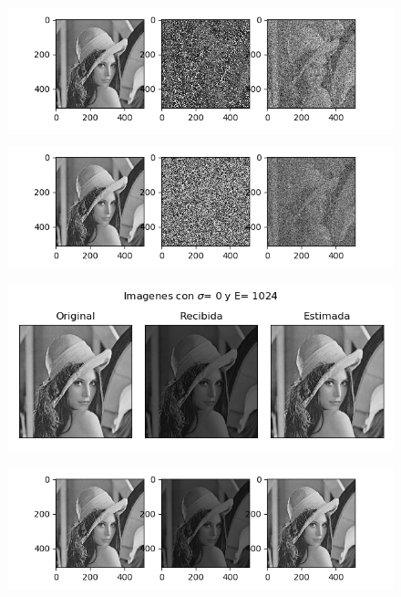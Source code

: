 \begin{figure}[H]
	\includegraphics[scale=1]{Imagenes/E32S50}
	\centering
\end{figure}

\begin{figure}[H]
\includegraphics[scale=1]{Imagenes/E32S100}
\centering
\end{figure}

\begin{figure}[H]
\includegraphics[scale=1]{Imagenes/E1024S00}
\centering
\end{figure}

\begin{figure}[H]
\includegraphics[scale=1]{Imagenes/E1024S01}
\centering
\end{figure}

